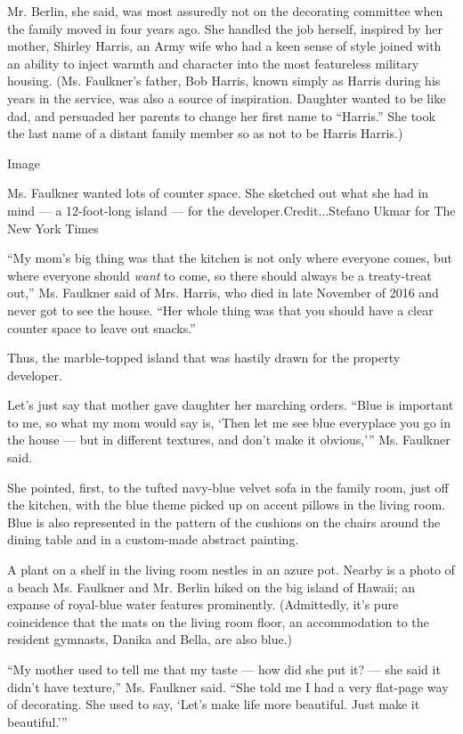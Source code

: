 Mr. Berlin, she said, was most assuredly not on the decorating committee
when the family moved in four years ago. She handled the job herself,
inspired by her mother, Shirley Harris, an Army wife who had a keen
sense of style joined with an ability to inject warmth and character
into the most featureless military housing. (Ms. Faulkner's father, Bob
Harris, known simply as Harris during his years in the service, was also
a source of inspiration. Daughter wanted to be like dad, and persuaded
her parents to change her first name to ``Harris.'' She took the last
name of a distant family member so as not to be Harris Harris.)

Image

Ms. Faulkner wanted lots of counter space. She sketched out what she had
in mind --- a 12-foot-long island --- for the developer.Credit...Stefano
Ukmar for The New York Times

``My mom's big thing was that the kitchen is not only where everyone
comes, but where everyone should \emph{want} to come, so there should
always be a treaty-treat out,'' Ms. Faulkner said of Mrs. Harris, who
died in late November of 2016 and never got to see the house. ``Her
whole thing was that you should have a clear counter space to leave out
snacks.''

Thus, the marble-topped island that was hastily drawn for the property
developer.

Let's just say that mother gave daughter her marching orders. ``Blue is
important to me, so what my mom would say is, `Then let me see blue
everyplace you go in the house --- but in different textures, and don't
make it obvious,''' Ms. Faulkner said.

She pointed, first, to the tufted navy-blue velvet sofa in the family
room, just off the kitchen, with the blue theme picked up on accent
pillows in the living room. Blue is also represented in the pattern of
the cushions on the chairs around the dining table and in a custom-made
abstract painting.

A plant on a shelf in the living room nestles in an azure pot. Nearby is
a photo of a beach Ms. Faulkner and Mr. Berlin hiked on the big island
of Hawaii; an expanse of royal-blue water features prominently.
(Admittedly, it's pure coincidence that the mats on the living room
floor, an accommodation to the resident gymnasts, Danika and Bella, are
also blue.)

``My mother used to tell me that my taste --- how did she put it? ---
she said it didn't have texture,'' Ms. Faulkner said. ``She told me I
had a very flat-page way of decorating. She used to say, `Let's make
life more beautiful. Just make it beautiful.'''

